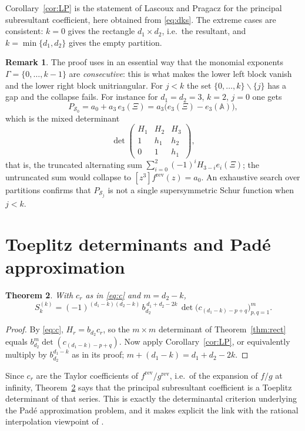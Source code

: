 \documentclass[11pt,reqno]{amsart}
\theoremstyle{plain}
\newtheorem{theorem}{Theorem}[section]
\theoremstyle{definition}
\newtheorem{remark}[theorem]{Remark}
\newcommand{\bA}{\mathbb{A}}
\newcommand{\bX}{\Xi}
\newcommand{\cS}{\mathcal{S}}
\newcommand{\rev}{\mathrm{rev}}
\begin{document}
Corollary~\ref{cor:LP} is the statement of Lascoux and Pragacz \cite{LP} for the
principal subresultant coefficient, here obtained from \eqref{eq:dks}. The
extreme cases are consistent: $k=0$ gives the rectangle $d_1\times d_2$, i.e.\ the
resultant, and $k=\min\{d_1,d_2\}$ gives the empty partition.

\begin{remark}\label{rmk:gaps}
The proof uses in an essential way that the monomial exponents
$\Gamma=\{0,\dots,k-1\}$ are \emph{consecutive}: this is what makes the lower left
block vanish and the lower right block unitriangular. For $j<k$ the set
$\{0,\dots,k\}\smallsetminus\{j\}$ has a gap and the collapse fails. For instance
for $d_1=d_2=3$, $k=2$, $j=0$ one gets
\[
  P_{\cS_0}=a_0+a_3\,e_3(\bX)=a_3\big(e_3(\bX)-e_3(\bA)\big),
\]
which is the mixed determinant
\[
  \det\begin{pmatrix}H_1&H_2&H_3\\ 1&h_1&h_2\\ 0&1&h_1\end{pmatrix},
\]
that is, the truncated alternating sum $\sum_{i=0}^{2}(-1)^iH_{3-i}e_i(\bX)$;
the untruncated sum would collapse to $[z^3]f^\rev(z)=a_0$. An exhaustive search
over partitions confirms that $P_{\cS_j}$ is not a single supersymmetric Schur
function when $j<k$.
\end{remark}

\section{Toeplitz determinants and Pad\'e approximation}\label{sec:toeplitz}

\begin{theorem}\label{thm:toeplitz}
With $c_r$ as in \eqref{eq:c} and $m=d_2-k$,
\[
  S_k^{(k)}=(-1)^{(d_1-k)(d_2-k)}\,b_{d_2}^{\,d_1+d_2-2k}\,
  \det\big(c_{(d_1-k)-p+q}\big)_{p,q=1}^{m}.
\]
\end{theorem}

\begin{proof}
By \eqref{eq:c}, $H_r=b_{d_2}c_r$, so the $m\times m$ determinant of
Theorem~\ref{thm:rect} equals $b_{d_2}^{m}\det(c_{(d_1-k)-p+q})$. Now apply
Corollary~\ref{cor:LP}, or equivalently multiply by $b_{d_2}^{d_1-k}$ as in its
proof; $m+(d_1-k)=d_1+d_2-2k$.
\end{proof}

Since $c_r$ are the Taylor coefficients of $f^\rev/g^\rev$, i.e.\ of the expansion
of $f/g$ at infinity, Theorem~\ref{thm:toeplitz} says that the principal
subresultant coefficient is a Toeplitz determinant of that series. This is exactly
the determinantal criterion underlying the Pad\'e approximation problem, and it
makes explicit the link with the rational interpolation viewpoint of
\cite{DKS15}.
\end{document}

